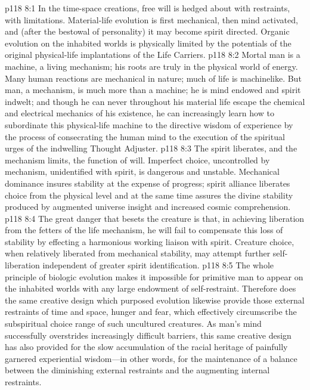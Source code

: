 %
\vs p118 8:1 In the time\hyp{}space creations, free will is hedged about with restraints, with limitations. Material\hyp{}life evolution is first mechanical, then mind activated, and (after the bestowal of personality) it may become spirit directed. Organic evolution on the inhabited worlds is physically limited by the potentials of the original physical\hyp{}life implantations of the Life Carriers.
\vs p118 8:2 Mortal man is a machine, a living mechanism; his roots are truly in the physical world of energy. Many human reactions are mechanical in nature; much of life is machinelike. But man, a mechanism, is much more than a machine; he is mind endowed and spirit indwelt; and though he can never throughout his material life escape the chemical and electrical mechanics of his existence, he can increasingly learn how to subordinate this physical\hyp{}life machine to the directive wisdom of experience by the process of consecrating the human mind to the execution of the spiritual urges of the indwelling Thought Adjuster.
\pc \vs p118 8:3 The spirit liberates, and the mechanism limits, the function of will. Imperfect choice, uncontrolled by mechanism, unidentified with spirit, is dangerous and unstable. Mechanical dominance insures stability at the expense of progress; spirit alliance liberates choice from the physical level and at the same time assures the divine stability produced by augmented universe insight and increased cosmic comprehension.
\vs p118 8:4 The great danger that besets the creature is that, in achieving liberation from the fetters of the life mechanism, he will fail to compensate this loss of stability by effecting a harmonious working liaison with spirit. Creature choice, when relatively liberated from mechanical stability, may attempt further self\hyp{}liberation independent of greater spirit identification.
\vs p118 8:5 The whole principle of biologic evolution makes it impossible for primitive man to appear on the inhabited worlds with any large endowment of self\hyp{}restraint. Therefore does the same creative design which purposed evolution likewise provide those external restraints of time and space, hunger and fear, which effectively circumscribe the subspiritual choice range of such uncultured creatures. As man’s mind successfully overstrides increasingly difficult barriers, this same creative design has also provided for the slow accumulation of the racial heritage of painfully garnered experiential wisdom---in other words, for the maintenance of a balance between the diminishing external restraints and the augmenting internal restraints.
